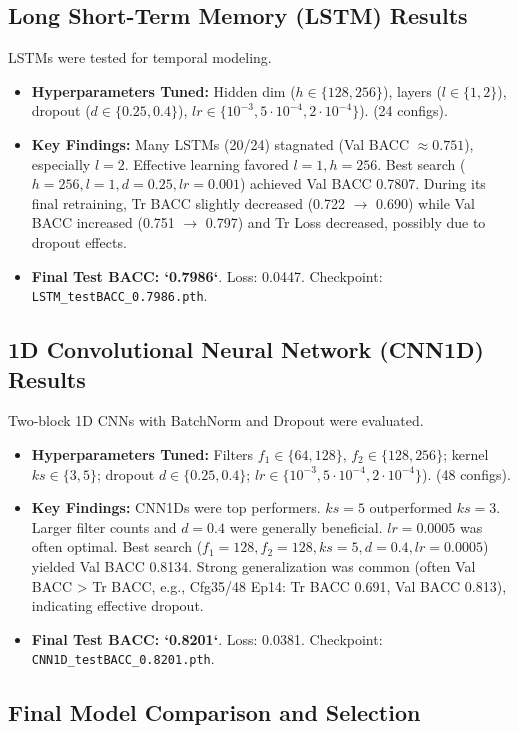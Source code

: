 \documentclass[11pt, a4paper]{article}
\newcommand{\code}[1]{\texttt{#1}}
\begin{document}
\subsection{Long Short-Term Memory (LSTM) Results}
LSTMs were tested for temporal modeling.
\begin{itemize}
    \item \textbf{Hyperparameters Tuned:} Hidden dim ($h \in \{128, 256\}$), layers ($l \in \{1, 2\}$), dropout ($d \in \{0.25, 0.4\}$), $lr \in \{10^{-3}, 5 \cdot 10^{-4}, 2 \cdot 10^{-4}\}$). (24 configs).
    \item \textbf{Key Findings:} Many LSTMs (20/24) stagnated (Val BACC $\approx 0.751$), especially $l=2$. Effective learning favored $l=1, h=256$. Best search ($h=256, l=1, d=0.25, lr=0.001$) achieved Val BACC 0.7807. During its final retraining, Tr BACC slightly decreased (0.722 $\to$ 0.690) while Val BACC increased (0.751 $\to$ 0.797) and Tr Loss decreased, possibly due to dropout effects.
    \item \textbf{Final Test BACC: `0.7986`}. Loss: 0.0447. Checkpoint: \code{LSTM\_testBACC\_0.7986.pth}.
\end{itemize}

\subsection{1D Convolutional Neural Network (CNN1D) Results}
\label{ssec:cnn1d_results}
Two-block 1D CNNs with BatchNorm and Dropout were evaluated.
\begin{itemize}
    \item \textbf{Hyperparameters Tuned:} Filters $f_1 \in \{64, 128\}$, $f_2 \in \{128, 256\}$; kernel $ks \in \{3, 5\}$; dropout $d \in \{0.25, 0.4\}$; $lr \in \{10^{-3}, 5 \cdot 10^{-4}, 2 \cdot 10^{-4}\}$). (48 configs).
    \item \textbf{Key Findings:} CNN1Ds were top performers. $ks=5$ outperformed $ks=3$. Larger filter counts and $d=0.4$ were generally beneficial. $lr=0.0005$ was often optimal. Best search ($f_1=128, f_2=128, ks=5, d=0.4, lr=0.0005$) yielded Val BACC 0.8134. Strong generalization was common (often Val BACC > Tr BACC, e.g., Cfg35/48 Ep14: Tr BACC 0.691, Val BACC 0.813), indicating effective dropout.
    \item \textbf{Final Test BACC: `0.8201`}. Loss: 0.0381. Checkpoint: \code{CNN1D\_testBACC\_0.8201.pth}.
\end{itemize}

\subsection{Final Model Comparison and Selection}
\end{document}
